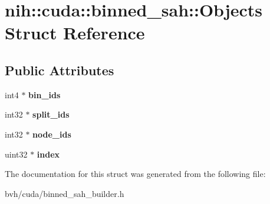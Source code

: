 \hypertarget{structnih_1_1cuda_1_1binned__sah_1_1_objects}{
\section{nih\-:\-:cuda\-:\-:binned\-\_\-sah\-:\-:\-Objects \-Struct \-Reference}
\label{structnih_1_1cuda_1_1binned__sah_1_1_objects}
}
\subsection*{\-Public \-Attributes}
\begin{DoxyCompactItemize}
\item 
\hypertarget{structnih_1_1cuda_1_1binned__sah_1_1_objects_a3f57033cd09c0296af4a05c95db4a97e}{
int4 $\ast$ {\bfseries bin\-\_\-ids}}
\label{structnih_1_1cuda_1_1binned__sah_1_1_objects_a3f57033cd09c0296af4a05c95db4a97e}

\item 
\hypertarget{structnih_1_1cuda_1_1binned__sah_1_1_objects_a78a94b6bd08e2ee0e0e9a7e1fe9b9476}{
int32 $\ast$ {\bfseries split\-\_\-ids}}
\label{structnih_1_1cuda_1_1binned__sah_1_1_objects_a78a94b6bd08e2ee0e0e9a7e1fe9b9476}

\item 
\hypertarget{structnih_1_1cuda_1_1binned__sah_1_1_objects_a39e5daf86a940b22eb79fafe506db1ec}{
int32 $\ast$ {\bfseries node\-\_\-ids}}
\label{structnih_1_1cuda_1_1binned__sah_1_1_objects_a39e5daf86a940b22eb79fafe506db1ec}

\item 
\hypertarget{structnih_1_1cuda_1_1binned__sah_1_1_objects_a0709f0e3baf173f76f712fb049ba8a7e}{
uint32 $\ast$ {\bfseries index}}
\label{structnih_1_1cuda_1_1binned__sah_1_1_objects_a0709f0e3baf173f76f712fb049ba8a7e}

\end{DoxyCompactItemize}


\-The documentation for this struct was generated from the following file\-:\begin{DoxyCompactItemize}
\item 
bvh/cuda/binned\-\_\-sah\-\_\-builder.\-h\end{DoxyCompactItemize}
